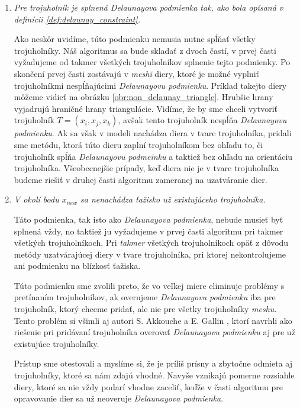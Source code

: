 \begin{enumerate}
     \item{
         \textit{Pre trojuholník je splnená \textit{Delaunayova podmienka} tak, ako bola opísaná v 
         definícii \ref{def:delaunay_constraint}.}

        Ako neskôr uvidíme, túto podmienku nemusia nutne spĺňať všetky trojuholníky. Náš algoritmus sa bude 
        skladať z dvoch častí, v prvej časti vyžadujeme od takmer všetkých trojuholníkov splnenie tejto podmienky.
        Po skončení prvej časti zostávajú v \textit{meshi} diery, ktoré je možné vyplniť trojuholníkmi nespĺňajúcimi 
        \textit{Delaunayovu podmienku}. Príklad takejto diery môžeme vidieť na obrázku 
        \ref{obr:non_delaunay_triangle}. Hrubšie hrany vyjadrujú hraničné hrany triangulácie. 
        Vidíme, že by sme chceli vytvoriť trojuholník $T = (x_i, x_j, x_k)$,
        avšak tento trojuholník nespĺňa \textit{Delaunayovu podmienku}. Ak sa však v modeli 
        nachádza diera v tvare trojuholníka, 
        pridali sme metódu, ktorá túto dieru zaplní trojuholníkom bez ohľadu to, či trojuholník spĺňa
        \textit{Delaunayovu podmeinku} a taktiež bez ohľadu na orientáciu trojuholníka. Všeobecnejšie prípady, 
        keď diera nie je v tvare trojuholníka budeme riešiť v druhej časti algoritmu zameranej na uzatváranie
        dier.
     }
    \newpage
     \item{
         \textit{V okolí bodu $x_{new}$ sa nenachádza ťažisko už existujúceho trojuholníka.}

         Táto podmienka, tak isto ako \textit{Delaunayova podmienka}, nebude musieť byť splnená vždy,
         no taktiež ju vyžadujeme v prvej časti algoritmu pri takmer všetkých trojuholníkoch. 
         Pri \textit{takmer} všetkých trojuholníkoch opäť z dôvodu metódy uzatvárajúcej diery v 
         tvare trojuholníka, pri ktorej nekontrolujeme ani podmienku na blízkosť ťažiska.

         Túto podmienku sme zvolili preto, že vo veľkej miere eliminuje problémy s pretínaním 
         trojuholníkov, ak overujeme \textit{Delaunayovu podmienku} iba pre trojuholník, ktorý chceme pridať,
         ale nie pre všetky trojuholníky \textit{meshu}. Tento problém si všimli aj autori S. Akkouche a 
         E. Gallin \cite{akkouche2001adaptive}, ktorí navrhli ako riešenie pri pridávaní trojuholníka 
         overovať \textit{Delaunayovu podmienku} aj pre už existujúce trojuholníky. 
         
         Prístup sme otestovali a myslíme si, že je príliš prísny a zbytočne odmieta aj trojuholníky, 
         ktoré sa nám zdajú vhodné. Navyše vznikajú pomerne rozsiahle diery, ktoré sa nie vždy podarí 
         vhodne zaceliť, keďže v časti algoritmu pre opravovanie dier sa už neoveruje
         \textit{Delaunayova podmienka}.

}
\end{enumerate}
